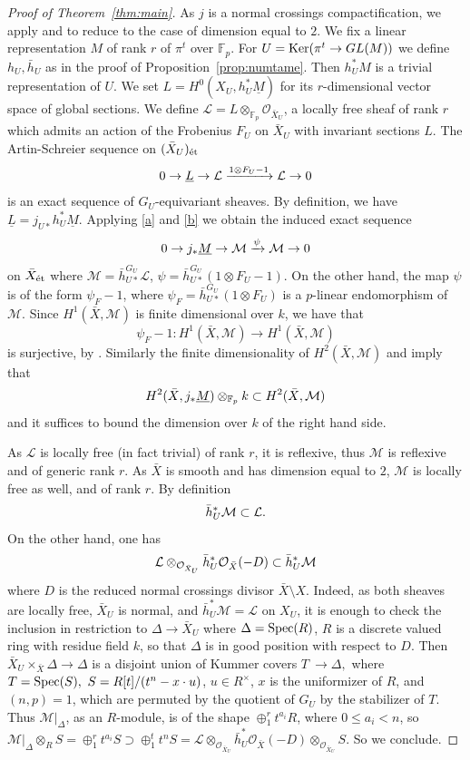 \documentclass[12pt]{amsart}
\theoremstyle{plain}
\theoremstyle{definition}
\numberwithin{thm}{section}
\newcommand{\ga}[2]{\begin{gather}\label{#1}#2 \end{gather}}
\newcommand{\sL}{{\mathcal L}}
\newcommand{\sM}{{\mathcal M}}
\newcommand{\sO}{{\mathcal O}}
\newcommand{\F}{{\mathbb F}}
\numberwithin{equation}{section}
\begin{document}
\begin{proof}[Proof of Theorem~\ref{thm:main}] 
As $j$ is a normal crossings compactification, we apply \cite[Theorem~1.1 b)]{EK16} and \cite[X, p.90]{SGA2} to reduce to the case of dimension equal to $2$. 
We fix a linear representation $M$ of rank $r$ of $\pi^t$ over $\F_p$.
For $U={\rm Ker}(\pi^t\to GL(M))$ we define $h_U, \bar h_U$ as in the proof of 
Proposition~\ref{prop:numtame}. Then $h_U^*M$ is a trivial representation of $U$. We set $L= H^0(X_U,  h_U^*\underline{M})$ for its $r$-dimensional vector space of global sections. We define $\sL=L\otimes_{\F_p} \sO_{\bar X_U}$, a locally free sheaf of rank $r$  which  admits an action of the Frobenius $F_U$ on $\bar X_U$ with invariant sections $L$. The Artin-Schreier sequence on $(\bar X_U)_{\rm \acute{e}t}$ 
\ga{}{0\to \underline{L} \to \sL \xrightarrow{1\otimes F_U  -1} \sL\to 0 \notag}
is  an exact sequence of $G_U$-equivariant sheaves.  By definition, we have   $\underline{L}=j_{U*} h_U^*\underline{M}$. 
Applying \eqref{a} and \eqref{b}  we obtain the induced exact sequence 
\ga{}{0\to j_*\underline{M}\to \sM\xrightarrow{\psi} \sM\to 0\notag}
on $\bar X_{\rm \acute{e}t}$ 
where $\sM= \bar h^{G_U}_{U*}\sL$, $\psi= \bar h^{G_U}_{U*}( 1\otimes F_U-1).$
On the other hand,
 the map $\psi$ is of the form $\psi_F-1$, where $\psi_F=\bar h^{G_U}_{U*}(1\otimes F_U)$ is a $p$-linear endomorphism of $\sM$. Since
$H^1(\bar X,\sM)$ is finite dimensional over $k$, we have that 
\[\psi_F-1:H^1(\bar X,\sM)\to H^1(\bar X,\sM)\]
is surjective, by \cite[XXII, Proposition~1.2]{SGA7.2}. Similarly the finite dimensionality of $H^2(\bar X,\sM)$ and \cite[XXII, (1.0.10) and Proposition~1.1]{SGA7.2}
imply that
\ga{}{H^2(\bar X, j_*\underline{M})\otimes_{\F_p}k\subset H^2(\bar X, \sM)\notag}
and it suffices to bound the dimension over $k$ of the right hand side.

 As $\sL$ is locally free (in fact trivial) of rank $r$,  it is reflexive, thus $\sM$ is reflexive and of generic rank $r$.  As $\bar X$ is smooth and has dimension equal to $2$, $\sM$ is locally free as well, and of rank $r$. By definition
 \ga{}{ \bar h_U^*\sM\subset \sL.\notag}
 On the other hand, one has
 \ga{}{ \sL\otimes_{\sO_{\bar X_U}} \bar h_U^*\sO_{\bar X}(-D)\subset \bar h_U^*\sM\notag}
 where $D$ is the reduced  normal crossings divisor $\bar X
 \setminus X$. Indeed, as both sheaves are locally free, $\bar X_U$ is normal, and $\bar h_U^*\sM=\sL$ on $X_U$, 
  it is enough to check  the inclusion in restriction to $\Delta \to \bar X_U$ where $\Delta={\rm Spec}(R)$, $R$ is a discrete valued ring with residue field $k$, so that $\Delta$ is in good position with respect to $D$. Then  $\bar X_U\times_{\bar X} \Delta\to \Delta$  is a disjoint union of Kummer covers $
T \  \to \Delta,$  where $T={\rm Spec}(S), \ S=R[t]/(t^n-x\cdot u)$,  $u\in R^\times$, $x$ is the uniformizer of $R$, and  $(n,p)=1$, which are permuted by the quotient of $G_U$ by the stabilizer of $T$.    Thus $\sM|_{\Delta}$, as an $R$-module, is of the shape $\oplus_1^r t^{a_i} R$, where $0\le a_i< n$, so $\sM|_{\Delta} \otimes_R  S=\oplus_1^r t^{a_i} S \supset \oplus_1^t t^n S= \sL\otimes_{\sO_{\bar X_U}} \bar h_U^*\sO_{\bar X}(-D)\otimes_{\sO_{\bar X_U}} S.  $ So we conclude.



\end{proof}
\end{document}
